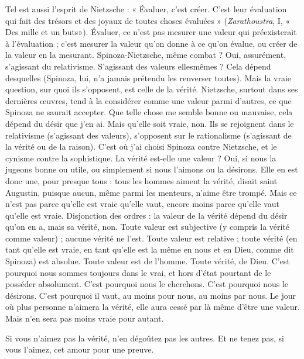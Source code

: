 Tel est aussi l'esprit de Nietzsche : « Évaluer, c’est créer. C’est leur évaluation
qui fait des trésors et des joyaux de toutes choses évaluées » ({\it Zarathoustra},
I, « Des mille et un buts»). Évaluer, ce n’est pas mesurer une valeur qui
préexisterait à l'évaluation ; c’est mesurer la valeur qu’on donne à ce qu’on
évalue, ou créer de la valeur en la mesurant. Spinoza-Nietzsche, même
combat ? Oui, assurément, s'agissant du relativisme. S'agissant des valeurs ellesmêmes ?
Cela dépend desquelles (Spinoza, lui, n’a jamais prétendu les renverser
toutes). Mais la vraie question, sur quoi ils s’opposent, est celle de la vérité.
Nietzsche, surtout dans ses dernières œuvres, tend à la considérer comme une
valeur parmi d’autres, ce que Spinoza ne saurait accepter. Que telle chose me
semble bonne ou mauvaise, cela dépend du désir que j’en ai. Mais qu’elle soit
vraie, non. Ils se rejoignent dans le relativisme (s'agissant des valeurs), s’opposent
sur le rationalisme (s’agissant de la vérité ou de la raison). C’est où j'ai
choisi Spinoza contre Nietzsche, et le cynisme contre la sophistique. La vérité
est-elle une valeur ? Oui, si nous la jugeons bonne ou utile, ou simplement si
nous l’aimons ou la désirons. Elle en est donc une, pour presque tous : tous les
hommes aiment la vérité, disait saint Augustin, puisque aucun, même parmi les
menteurs, n’aime être trompé. Mais ce n’est pas parce qu’elle est vraie qu’elle
vaut, encore moins parce qu'elle vaut qu’elle est vraie. Disjonction des ordres :
la valeur de la vérité dépend du désir qu’on en a, mais sa vérité, non. Toute
valeur est subjective (y compris la vérité comme valeur) ; aucune vérité ne l’est.
Toute valeur est relative ; toute vérité (en tant qu’elle est vraie, en tant qu’elle
est la même en nous et en Dieu, comme dit Spinoza) est absolue. Toute valeur
est de l’homme. Toute vérité, de Dieu. C’est pourquoi nous sommes toujours
dans le vrai, et hors d’état pourtant de le posséder absolument. C’est pourquoi
nous le cherchons. C’est pourquoi nous le désirons. C’est pourquoi il vaut, au
moins pour nous, au moins par nous. Le jour où plus personne n’aimera la
vérité, elle aura cessé par là même d’être une valeur. Mais n’en sera pas moins
vraie pour autant.

Si vous n’aimez pas la vérité, n’en dégoûtez pas les autres. Et ne tenez pas,
si vous l’aimez, cet amour pour une preuve.

